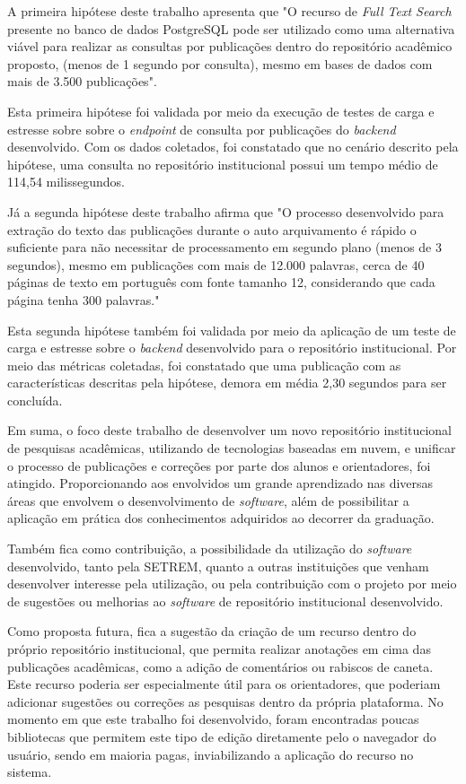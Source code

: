 A primeira hipótese deste trabalho apresenta que "O recurso de \emph{Full Text Search} presente
no banco de dados PostgreSQL pode ser utilizado como uma alternativa viável para realizar
as consultas por publicações dentro do repositório acadêmico proposto, (menos de 1 segundo
por consulta), mesmo em bases de dados com mais de 3.500 publicações".

Esta primeira hipótese foi validada por meio da execução de testes de carga e estresse
sobre sobre o \emph{endpoint} de consulta por publicações do \emph{backend} desenvolvido.
Com os dados coletados, foi constatado que no cenário descrito pela hipótese, uma consulta
no repositório institucional possui um tempo médio de 114,54 milissegundos.

Já a segunda hipótese deste trabalho afirma que "O processo desenvolvido para extração do
texto das publicações durante o auto arquivamento é rápido o suficiente para não necessitar
de processamento em segundo plano (menos de 3 segundos), mesmo em publicações com mais de
12.000 palavras, cerca de 40 páginas de texto em português com fonte tamanho 12,
considerando que cada página tenha 300 palavras."

Esta segunda hipótese também foi validada por meio da aplicação de um teste de carga
e estresse sobre o \emph{backend} desenvolvido para o repositório institucional. Por meio
das métricas coletadas, foi constatado que uma publicação com as características
descritas pela hipótese, demora em média 2,30 segundos para ser concluída.

Em suma, o foco deste trabalho de desenvolver um novo repositório institucional
de pesquisas acadêmicas, utilizando de tecnologias baseadas em nuvem, e unificar
o processo de publicações e correções por parte dos alunos e orientadores, foi atingido.
Proporcionando aos envolvidos um grande aprendizado nas diversas áreas que envolvem
o desenvolvimento de \emph{software}, além de possibilitar a aplicação em prática dos
conhecimentos adquiridos ao decorrer da graduação.

Também fica como contribuição, a possibilidade da utilização do \emph{software}
desenvolvido, tanto pela SETREM, quanto a outras instituições que venham desenvolver
interesse pela utilização, ou pela contribuição com o projeto por meio de sugestões
ou melhorias ao \emph{software} de repositório institucional desenvolvido.

Como proposta futura, fica a sugestão da criação de um recurso dentro do próprio
repositório institucional, que permita realizar anotações em cima das publicações
acadêmicas, como a adição de comentários ou rabiscos de caneta. Este recurso poderia
ser especialmente útil para os orientadores, que poderiam adicionar sugestões ou
correções as pesquisas dentro da própria plataforma. No momento em que este trabalho
foi desenvolvido, foram encontradas poucas bibliotecas que permitem este tipo de
edição diretamente pelo o navegador do usuário, sendo em maioria pagas,
inviabilizando a aplicação do recurso no sistema.
